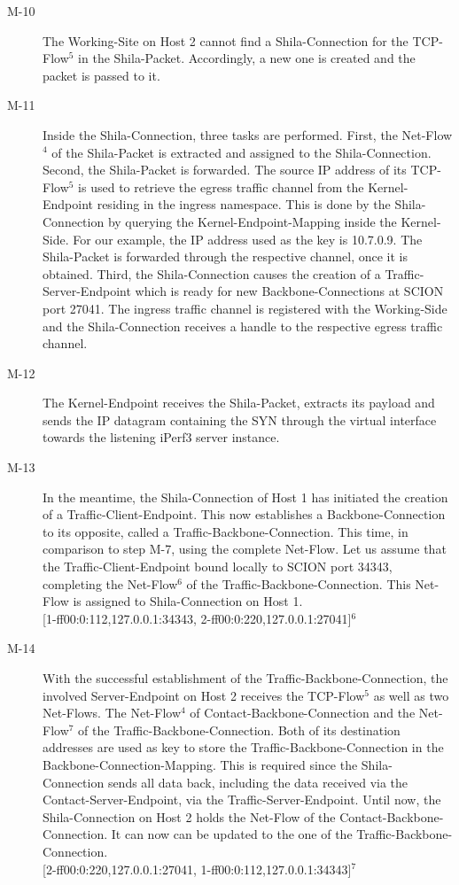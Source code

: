 \begin{description}
	\item[M-10] The Working-Site on Host 2 cannot find a Shila-Connection for the TCP-Flow$^{5}$ in the Shila-Packet. Accordingly, a new one is created and the packet is passed to it.
	\item[M-11] Inside the Shila-Connection, three tasks are performed. First, the Net-Flow$^{4}$ of the Shila-Packet is extracted and assigned to the Shila-Connection.  %
	Second, the Shila-Packet is forwarded. The source IP address of its TCP-Flow$^{5}$ is used to retrieve the egress traffic channel from the Kernel-Endpoint residing in the ingress namespace. This is done by the Shila-Connection by querying the Kernel-Endpoint-Mapping inside the Kernel-Side. For our example, the IP address used as the key is {\footnotesize 10.7.0.9}. The Shila-Packet is forwarded through the respective channel, once it is obtained. Third, the Shila-Connection causes the creation of a Traffic-Server-Endpoint which is ready for new Backbone-Connections at SCION port {\footnotesize 27041}. The ingress traffic channel is registered with the Working-Side and the Shila-Connection receives a handle to the respective egress traffic channel.
	\item[M-12] The Kernel-Endpoint receives the Shila-Packet, extracts its payload and sends the IP datagram containing the SYN through the virtual interface towards the listening iPerf3 server instance.
	\item[M-13] In the meantime, the Shila-Connection of Host 1 has initiated the creation of a Traffic-Client-Endpoint. This now establishes a Backbone-Connection to its opposite, called a Traffic-Backbone-Connection. This time, in comparison to step M-7, using the complete Net-Flow. Let us assume that the Traffic-Client-Endpoint bound locally to SCION port {\footnotesize 34343}, completing the Net-Flow$^{6}$ of the Traffic-Backbone-Connection. This Net-Flow is assigned to Shila-Connection on Host 1.
	\medskip\\{\footnotesize [1-ff00:0:112,127.0.0.1:34343, 2-ff00:0:220,127.0.0.1:27041]$^{6}$}
	\item[M-14] With the successful establishment of the Traffic-Backbone-Connection, the involved Server-Endpoint on Host 2 receives the TCP-Flow$^{5}$ as well as two Net-Flows. The Net-Flow$^{4}$ of Contact-Backbone-Connection and the Net-Flow$^{7}$ of the Traffic-Backbone-Connection. Both of its destination addresses are used as key to store the Traffic-Backbone-Connection in the Backbone-Connection-Mapping. This is required since the Shila-Connection sends all data back, including the data received via the Contact-Server-Endpoint, via the Traffic-Server-Endpoint. Until now, the Shila-Connection on Host 2 holds the Net-Flow of the Contact-Backbone-Connection. It can now can be updated to the one of the Traffic-Backbone-Connection.\medskip\\{\footnotesize [2-ff00:0:220,127.0.0.1:27041, 1-ff00:0:112,127.0.0.1:34343]$^{7}$}
\end{description}	
